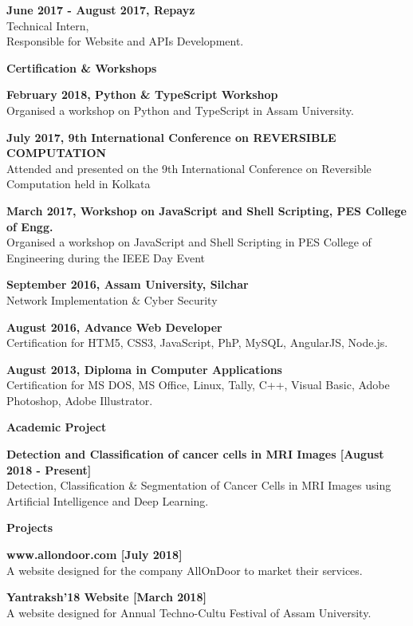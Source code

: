 \documentclass[a4paper,11pt,final]{memoir}
\newcommand{\Sep}{\vspace{1.5em}}
\newcommand{\SmallSep}{\vspace{0.5em}}
\newcommand{\CVSection}[1]
	{\Large\textbf{#1}\par
	\SmallSep\normalsize\normalfont}
\newcommand{\CVItem}[1]
	{\textbf{\color{RoyalBlue} #1}}
\begin{document}
\CVItem{June 2017 - August 2017, Repayz}\\
Technical Intern,\\
Responsible for Website and APIs Development.
\SmallSep

\Sep

\CVSection{Certification \& Workshops}

\CVItem{February 2018,  Python \& TypeScript Workshop }\\
Organised a workshop on Python and TypeScript in Assam University.
\SmallSep

\CVItem{July 2017, 9th International Conference on REVERSIBLE COMPUTATION }\\
Attended and presented on the 9th International Conference on Reversible Computation held in Kolkata
\SmallSep

\CVItem{March 2017, Workshop on JavaScript and Shell Scripting, PES College of Engg.}\\
Organised a workshop on JavaScript and Shell Scripting in PES College of Engineering during the IEEE Day Event
\SmallSep

\CVItem{September 2016, Assam University, Silchar}\\
Network Implementation & Cyber Security
\SmallSep

\CVItem{August 2016, Advance Web Developer}\\
Certification for HTM5, CSS3, JavaScript, PhP, MySQL, AngularJS, Node.js.
\SmallSep

\CVItem{August 2013, Diploma in Computer Applications}\\
Certification for MS DOS, MS Office, Linux, Tally, C++, Visual Basic, Adobe Photoshop, Adobe Illustrator.
\SmallSep

\CVSection{Academic Project}
\CVItem{Detection and Classification of cancer cells in MRI Images [August 2018 - Present]}\\
Detection, Classification \& Segmentation of Cancer Cells in MRI Images using Artificial Intelligence and Deep Learning.
\SmallSep

\clearpage
\framebreak
\framebreak

\CVSection{Projects}

\CVItem{www.allondoor.com [July 2018]}\\
A website designed for the company AllOnDoor to market their services. 
\SmallSep

\CVItem{Yantraksh'18 Website [March 2018] }\\
 A website designed for Annual Techno-Cultu Festival of Assam University. 
\SmallSep
\end{document}
